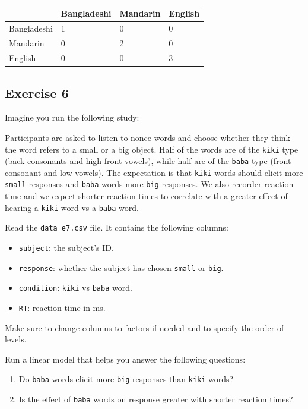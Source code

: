 \documentclass[
]{article}
\providecommand{\tightlist}{%
  \setlength{\itemsep}{0pt}\setlength{\parskip}{0pt}}
\begin{document}
\begin{longtable}[]{@{}llll@{}}
\toprule\noalign{}
& Bangladeshi & Mandarin & English \\
\midrule\noalign{}
\endhead
\bottomrule\noalign{}
\endlastfoot
Bangladeshi & 1 & 0 & 0 \\
Mandarin & 0 & 2 & 0 \\
English & 0 & 0 & 3 \\
\end{longtable}

\hypertarget{exercise-6}{%
\subsection{Exercise 6}\label{exercise-6}}

Imagine you run the following study:

Participants are asked to listen to nonce words and choose whether they
think the word refers to a small or a big object. Half of the words are
of the \texttt{kiki} type (back consonants and high front vowels), while
half are of the \texttt{baba} type (front consonant and low vowels). The
expectation is that \texttt{kiki} words should elicit more
\texttt{small} responses and \texttt{baba} words more \texttt{big}
responses. We also recorder reaction time and we expect shorter reaction
times to correlate with a greater effect of hearing a \texttt{kiki} word
vs a \texttt{baba} word.

Read the \texttt{data\_e7.csv} file. It contains the following columns:

\begin{itemize}
\tightlist
\item
  \texttt{subject}: the subject's ID.
\item
  \texttt{response}: whether the subject has chosen \texttt{small} or
  \texttt{big}.
\item
  \texttt{condition}: \texttt{kiki} vs \texttt{baba} word.
\item
  \texttt{RT}: reaction time in ms.
\end{itemize}

Make sure to change columns to factors if needed and to specify the
order of levels.

Run a linear model that helps you answer the following questions:

\begin{enumerate}
\def\labelenumi{\arabic{enumi}.}
\tightlist
\item
  Do \texttt{baba} words elicit more \texttt{big} responses than
  \texttt{kiki} words?
\item
  Is the effect of \texttt{baba} words on response greater with shorter
  reaction times?
\end{enumerate}
\end{document}
